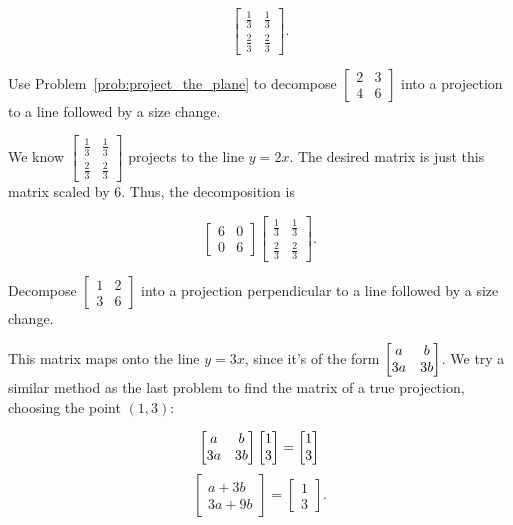 \documentclass[../gatm_answers.tex]{subfiles}
\begin{document}
\begin{iinner_problem}
\begin{iinner_problem}
\begin{iinner_problem}
$$\begin{bmatrix}
\frac{1}{3} & \frac{1}{3} \\
\frac{2}{3} & \frac{2}{3}
\end{bmatrix}.$$

\begin{outer_problem}
\item Use Problem~\ref{prob:project_the_plane} to decompose $\left[\begin{smallmatrix} 2 & 3 \\ 4 & 6 \end{smallmatrix}\right]$ into a projection to a line followed by a size change.
\end{outer_problem}

We know $\begin{bmatrix}
\frac{1}{3} & \frac{1}{3} \\
\frac{2}{3} & \frac{2}{3}
\end{bmatrix}$ projects to the line $y=2x$. The desired matrix is just this matrix scaled by $6$. Thus, the decomposition is

$$\begin{bmatrix}6 & 0 \\ 0 & 6 \end{bmatrix} \begin{bmatrix}
\frac{1}{3} & \frac{1}{3} \\
\frac{2}{3} & \frac{2}{3}
\end{bmatrix}.$$

\begin{outer_problem}
\item Decompose $\left[\begin{smallmatrix} 1 & 2 \\ 3 & 6\end{smallmatrix}\right]$ into a projection perpendicular to a line followed by a size change.
\end{outer_problem}

This matrix maps onto the line $y=3x$, since it's of the form $\begin{bmatrix} a & b \\ 3a & 3b \end{bmatrix}$. We try a similar method as the last problem to find the matrix of a true projection, choosing the point $(1,3)$:

$$\begin{bmatrix} a & b \\ 3a & 3b \end{bmatrix}\begin{bmatrix} 1 \\ 3 \end{bmatrix} = \begin{bmatrix} 1 \\ 3 \end{bmatrix}$$
$$\begin{bmatrix} a + 3b \\ 3a + 9b \end{bmatrix} = \begin{bmatrix} 1 \\ 3 \end{bmatrix}.$$


\end{iinner_problem}
\end{iinner_problem}
\end{iinner_problem}
\end{document}

